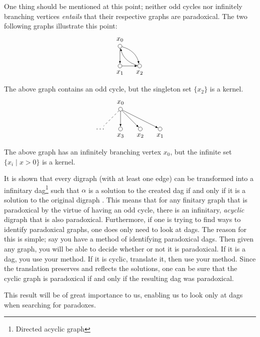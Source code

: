 One thing should be mentioned at this point; neither odd cycles nor infinitely branching vertices \textit{entails} that their respective graphs are paradoxical.
The two following graphs illustrate this point:
\begin{align}
  \begin{aligned}
    \begin{tikzpicture}
      [
      point/.style={circle,draw,inner sep=0pt,minimum size=2mm},
      collection/.style={thick,rectangle,draw,inner sep=0pt,minimum height=14mm, minimum width= 9mm}
      ]
      \node (0) at (0,1) [point,label=above:$x_0$] {};
      \node (1) at (0,0) [point,label=below:$x_1$] {};
      \node (2) at (1,0) [point,label=below:$x_2$] {};
      \draw [-latex] (0) to (1);
      \draw [-latex] (1) to (2);
      \draw [-latex, bend left] (2) to (0);
      \draw [-latex, bend left] (0) to (2);
    \end{tikzpicture}
  \end{aligned}
\end{align}
The above graph contains an odd cycle, but the singleton set $\{x_2\}$ is a kernel.
\begin{align}
  \begin{aligned}
    \begin{tikzpicture}
      [
      point/.style={circle,draw,inner sep=0pt,minimum size=2mm},
      collection/.style={thick,rectangle,draw,inner sep=0pt,minimum height=14mm, minimum width= 9mm}
      ]
      \node (0) at (1,2) [point,label=above:$x_0$] {};
      \node (1) at (3,1) [point,label=below:$x_1$] {};
      \node (2) at (2,1) [point,label=below:$x_2$] {};
      \node (3) at (1,1) [point,label=below:$x_3$] {};
      \node (4) at (0,1) [] {$\dots$};
      \draw [-latex] (0) to (1);
      \draw [-latex] (0) to (2);
      \draw [-latex] (0) to (3);
      \draw [dashed] (0) to (4);
    \end{tikzpicture}
  \end{aligned}
\end{align}
The above graph has an infinitely branching vertex $x_0$, but the infinite set $\{x_i \;|\; x > 0\}$ is a kernel.

It is shown that every digraph (with at least one edge) can be transformed into a infinitary dag\footnote{Directed acyclic graph} such that $\alpha$ is a solution to the created dag if and only if it is a solution to the original digraph \cite{apal-digraph}.
This means that for any finitary graph that is paradoxical by the virtue of having an odd cycle, there is an infinitary, \textit{acyclic} digraph that is also paradoxical.
Furthermore, if one is trying to find ways to identify paradoxical graphs, one does only need to look at dags.
The reason for this is simple; say you have a method of identifying paradoxical dags.
Then given any graph, you will be able to decide whether or not it is paradoxical.
If it is a dag, you use your method.
If it is cyclic, translate it, then use your method.
Since the translation preserves and reflects the solutions, one can be sure that the cyclic graph is paradoxical if and only if the resulting dag was paradoxical.

This result will be of great importance to us, enabling us to look only at dags when searching for paradoxes.
